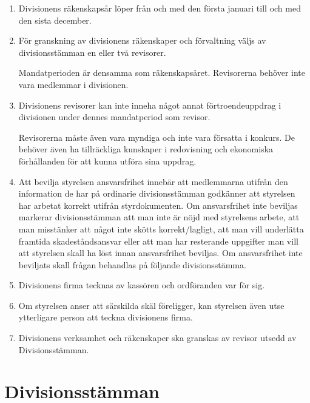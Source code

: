 \documentclass{dvd}
\begin{document}
	\begin{enumerate}[label=\arabic* §, ref=\arabic*]

		\item Divisionens räkenskapsår löper från och med den första januari till och med den sista december.

		\item För granskning av divisionens räkenskaper och förvaltning väljs av divisionsstämman en eller två revisorer.

		Mandatperioden är densamma som räkenskapsåret.
		Revisorerna behöver inte vara medlemmar i divisionen.

		\item Divisionens revisorer kan inte inneha något annat förtroendeuppdrag i divisionen under dennes mandatperiod som revisor.

		Revisorerna måste även vara myndiga och inte vara försatta i konkurs.
		De behöver även ha tillräckliga kunskaper i redovisning och ekonomiska förhållanden för att kunna utföra sina uppdrag.

		\item Att bevilja styrelsen ansvarsfrihet innebär att medlemmarna utifrån den information de har på ordinarie divisionsstämman godkänner att styrelsen har arbetat korrekt utifrån styrdokumenten.
		Om ansvarsfrihet inte beviljas markerar divisionsstämman att man inte är nöjd med styrelsens arbete, att man misstänker att något inte skötts korrekt/lagligt, att man vill underlätta framtida skadeståndsansvar eller att man har resterande uppgifter man vill att styrelsen skall ha löst innan ansvarsfrihet beviljas.
		Om ansvarsfrihet inte beviljats skall frågan behandlas på följande divisionsstämma.

		\item Divisionens firma tecknas av kassören och ordföranden var för sig.

		\item Om styrelsen anser att särskilda skäl föreligger, kan styrelsen även utse ytterligare person att teckna divisionens firma.

		\item Divisionens verksamhet och räkenskaper ska granskas av revisor utsedd av Divisionsstämman.

	\end{enumerate}

	\section{Divisionsstämman}
\end{document}
